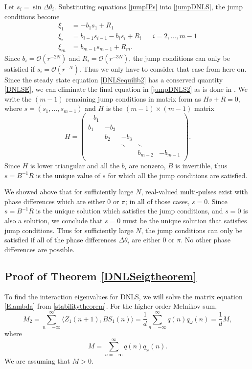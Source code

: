\documentclass[12pt]{elsarticle}
\begin{document}
Let $s_i = \sin{\Delta\theta_i}$. Substituting equations \cref{jumpIPs} into \cref{jumpDNLS}, the jump conditions become
\begin{equation}\label{jumpDNLS2}
\begin{aligned}
\xi_1 &= -b_1 s_1 + R_1 \\
\xi_i &= b_{i-1} s_{i-1} - b_i s_i + R_i
&& i = 2, \dots, m-1 \\
\xi_m &= b_{m-1} s_{m-1} + R_m.
\end{aligned}
\end{equation}
Since $b_i = \mathcal{O}(r^{-2N})$ and $R_i = \mathcal{O}(r^{-3N})$, the jump conditions can only be satisfied if $s_i = \mathcal{O}(r^{-N})$. Thus we only have to consider that case from here on. Since the steady state equation \cref{DNLSequilib2} has a conserved quantity \cref{DNLSE}, we can eliminate the final equation in \cref{jumpDNLS2} as is done in \cite{SandstedeStrut}. We write the $(m-1)$ remaining jump conditions in matrix form as $H s + R = 0$, where $s = (s_1, \dots, s_{m-1})$ and $H$ is the $(m-1)\times(m-1)$ matrix
\[
H = \begin{pmatrix}
-b_1 \\
b_1 & -b_2 \\
& b_2 & -b_3 \\
&& \ddots & \ddots \\
&&& b_{m-2} & -b_{m-1} \\
\end{pmatrix}.
\]
Since $H$ is lower triangular and all the $b_i$ are nonzero, $B$ is invertible, thus $s = B^{-1}R$ is the unique value of $s$ for which all the jump conditions are satisfied. 

We showed above that for sufficiently large $N$, real-valued multi-pulses exist with phase differences which are either 0 or $\pi$; in all of those cases, $s = 0$. Since $s = B^{-1}R$ is the unique solution which satisfies the jump conditions, and $s = 0$ is also a solution, we conclude that $s = 0$ must be the unique solution that satisfies jump conditions. Thus for sufficiently large $N$, the jump conditions can only be satisfied if all of the phase differences $\Delta \theta_i$ are either 0 or $\pi$. No other phase differences are possible.

\subsection{Proof of Theorem \ref{DNLSeigtheorem}}

To find the interaction eigenvalues for DNLS, we will solve the matrix equation \cref{Elambda} from \cref{stabilitytheorem}. For the higher order Melnikov sum,
\[
M_2 = \sum_{n=-\infty}^\infty \langle Z_1(n+1), B S_1(n) \rangle =
\frac{1}{d} \sum_{n=-\infty}^\infty q(n) q_\omega(n) = \frac{1}{d}M,
\]
where
\[
M = \sum_{n=-\infty}^\infty q(n) q_\omega(n).
\]
We are assuming that $M > 0$. 
\end{document}
